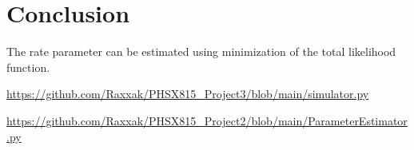\documentclass[12pt]{article}
\begin{document}
	
\section{Conclusion}
The rate parameter can be estimated using minimization of the total likelihood function.
	
	
	
	
\begin{thebibliography}{9}
	\url{https://github.com/Raxxak/PHSX815_Project3/blob/main/simulator.py} 

	\url{https://github.com/Raxxak/PHSX815_Project2/blob/main/ParameterEstimator.py}
	

	
\end{thebibliography}
	
\end{document}
